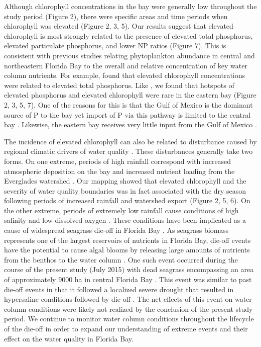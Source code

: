 Although chlorophyll concentrations in the bay were generally low throughout the study period (Figure 2), there were specific areas and time periods when chlorophyll was elevated (Figure 2, 3, 5). Our results suggest that elevated chlorophyll is most strongly related to the presence of elevated total phosphorus, elevated particulate phosphorus, and lower NP ratios (Figure 7). This is consistent with previous studies relating phytoplankton abundance in central and northeastern Florida Bay to the overall and relative concentration of key water column nutrients. For example, \citet{fourqurean1993process} found that elevated chlorophyll concentrations were related to elevated total phosphorus. Like \citet{fourqurean1993process}, we found that hotspots of elevated phosphorus and elevated chlorophyll were rare in the eastern bay (Figure 2, 3, 5, 7). One of the reasons for this is that the Gulf of Mexico is the dominant source of P to the bay yet import of P via this pathway is limited to the central bay \citep{childers_relating_2006, rudnick1999phosphorus}. Likewise, the eastern bay receives very little input from the Gulf of Mexico \citep{lee2016circulation}. 

The incidence of elevated chlorophyll can also be related to disturbance caused by regional climatic drivers of water quality \citep{davis2004importance, briceno_climatic_2009}. These disturbances generally take two forms. On one extreme, periods of high rainfall correspond with increased atmospheric deposition on the bay and increased nutrient loading from the Everglades watershed \citep{rudnick1999phosphorus,sutula2003factors}. Our mapping showed that elevated chlorophyll and the severity of water quality boundaries was in fact associated with the dry season following periods of increased rainfall and watershed export (Figure 2, 5, 6). On the other extreme, periods of extremely low rainfall cause conditions of high salinity and low dissolved oxygen \citep{hall2016recurrence}. These conditions have been implicated as a cause of widespread seagrass die-off in Florida Bay \citep{borum2005potential, zieman1999seagrass}. As seagrass biomass represents one of the largest reservoirs of nutrients in Florida Bay, die-off events have the potential to cause algal blooms by releasing large amounts of nutrients from the benthos to the water column \citep{fourqurean2012carbon, zhang2004potential}. One such event occurred during the course of the present study (July 2015) with dead seagrass encompassing an area of approximately 9000 ha in central Florida Bay \citep{hall2016recurrence}. This event was similar to past die-off events in that it followed a localized severe drought that resulted in hypersaline conditions followed by die-off \citep[Figure 4, ][]{robblee1991mass}. The net effects of this event on water column conditions were likely not realized by the conclusion of the present study period. We continue to monitor water column conditions throughout the lifecycle of the die-off in order to expand our understanding of extreme events and their effect on the water quality in Florida Bay.

